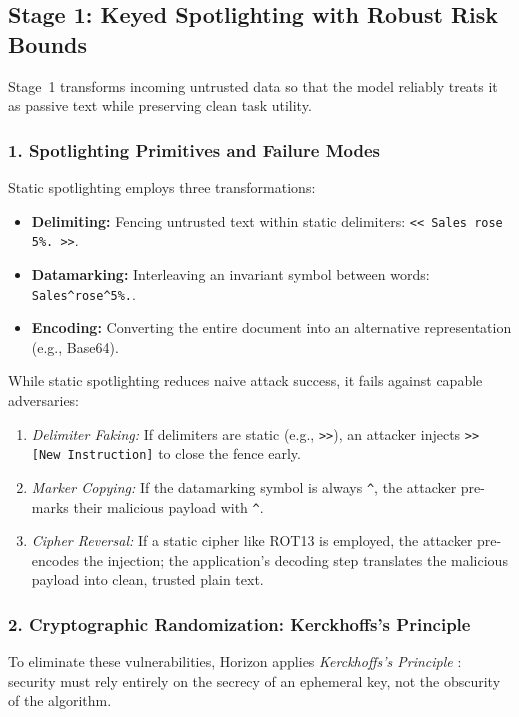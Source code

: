 \subsection{Stage 1: Keyed Spotlighting with Robust Risk Bounds}
\label{subsec:horizon_stage1}

Stage~1 transforms incoming untrusted data so that the model reliably treats it as passive text while preserving clean task utility.

\subsubsection{1. Spotlighting Primitives and Failure Modes}
Static spotlighting \cite{hines2024spotlighting} employs three transformations:
\begin{itemize}
    \item \textbf{Delimiting:} Fencing untrusted text within static delimiters: \texttt{<< Sales rose 5\%. >>}.
    \item \textbf{Datamarking:} Interleaving an invariant symbol between words: \texttt{Sales\^{}rose\^{}5\%.}.
    \item \textbf{Encoding:} Converting the entire document into an alternative representation (e.g., Base64).
\end{itemize}

While static spotlighting reduces naive attack success, it fails against capable adversaries:
\begin{enumerate}
    \item \emph{Delimiter Faking:} If delimiters are static (e.g., \texttt{>>}), an attacker injects \texttt{>> [New Instruction]} to close the fence early.
    \item \emph{Marker Copying:} If the datamarking symbol is always \texttt{\^{}}, the attacker pre-marks their malicious payload with \texttt{\^{}}.
    \item \emph{Cipher Reversal:} If a static cipher like ROT13 is employed, the attacker pre-encodes the injection; the application's decoding step translates the malicious payload into clean, trusted plain text.
\end{enumerate}

\subsubsection{2. Cryptographic Randomization: Kerckhoffs's Principle}
To eliminate these vulnerabilities, Horizon applies \emph{Kerckhoffs's Principle} \cite{kerckhoffs1883}: security must rely entirely on the secrecy of an ephemeral key, not the obscurity of the algorithm.


